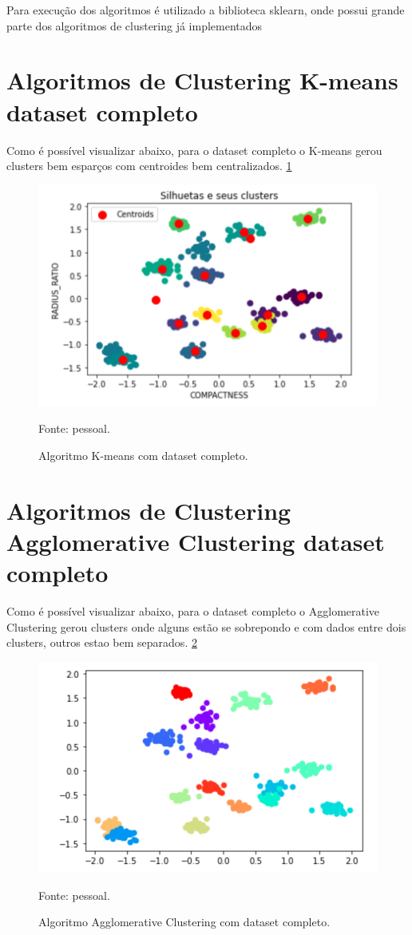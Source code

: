 Para execução dos algoritmos é utilizado a biblioteca sklearn, onde possui grande parte dos algoritmos de clustering já implementados

\section{Algoritmos de Clustering K-means dataset completo}

Como é possível visualizar abaixo, para o dataset completo o K-means gerou clusters bem esparços com centroides bem centralizados. \ref{fig:kmeansCompleto}

\begin{figure}[h]
	\centering
	\includegraphics[width=0.7\linewidth]{images/kmeansCompleto}
	\caption{Algoritmo K-means com dataset completo.}
	Fonte: pessoal.
	\label{fig:kmeansCompleto}
\end{figure}

\section{Algoritmos de Clustering Agglomerative Clustering dataset completo}

Como é possível visualizar abaixo, para o dataset completo o Agglomerative Clustering gerou clusters onde alguns estão se sobrepondo e com dados entre dois clusters, outros estao bem separados. \ref{fig:aglomerativeClusteringCompleto}

\begin{figure}[h]
	\centering
	\includegraphics[width=0.7\linewidth]{images/aglomerativeClusteringCompleto}
	\caption{Algoritmo Agglomerative Clustering com dataset completo.}
	Fonte: pessoal.
	\label{fig:aglomerativeClusteringCompleto}
\end{figure}


